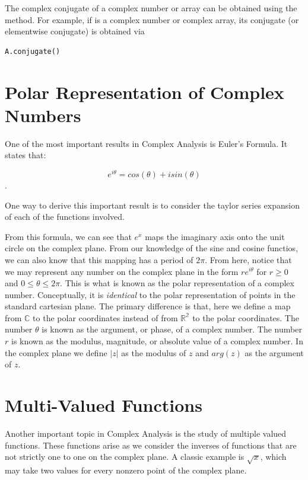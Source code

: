 The complex conjugate of a complex number or array can be obtained using the  method.
For example, if  is a complex number or complex array, its conjugate (or elementwise conjugate) is obtained via
\begin{lstlisting}
A.conjugate()
\end{lstlisting}

\section*{Polar Representation of Complex Numbers}

One of the most important results in Complex Analysis is Euler's Formula.
It states that:

$$e^{i\theta}=cos(\theta)+i sin(\theta)$$.

One way to derive this important result is to consider the taylor series expansion of each of the functions involved.

From this formula, we can see that $e^x$ maps the imaginary axis onto the unit circle on the complex plane.
From our knowledge of the sine and cosine functios, we can also know that this mapping has a period of $2\pi$.
From here, notice that we may represent any number on the complex plane in the form $r e^{i\theta}$ for $r\geq 0$ and $0 \leq \theta \leq 2\pi$.
This is what is known as the polar representation of a complex number.
Conceptually, it is \emph{identical} to the polar representation of points in the standard cartesian plane.
The primary difference is that, here we define a map from $\mathbb{C}$ to the polar coordinates instead of from $\mathbb{R^2}$ to the polar coordinates.
The number $\theta$ is known as the argument, or phase, of a complex number.
The number $r$ is known as the modulus, magnitude, or absolute value of a complex number.
In the complex plane we define $|z|$ as the modulus of $z$ and $arg(z)$ as the argument of $z$.

\section*{Multi-Valued Functions}

Another important topic in Complex Analysis is the study of multiple valued functions.
These functions arise as we consider the inverses of functions that are not strictly one to one on the complex plane.
A classic example is $\sqrt{x}$, which may take two values for every nonzero point of the complex plane.

